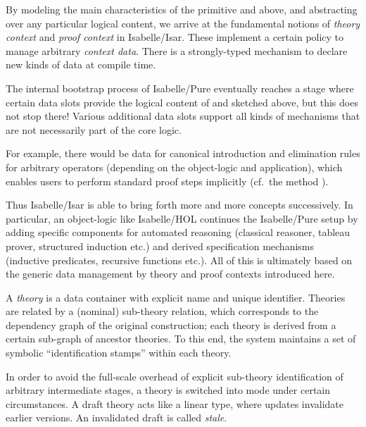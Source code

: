 \begin{isabellebody}
\begin{isamarkuptext}
\begin{itemize}
  \end{itemize}

  \medskip By modeling the main characteristics of the primitive
  \isa{{\isasymTheta}} and \isa{{\isasymGamma}} above, and abstracting over any
  particular logical content, we arrive at the fundamental notions of
  \emph{theory context} and \emph{proof context} in Isabelle/Isar.
  These implement a certain policy to manage arbitrary \emph{context
  data}.  There is a strongly-typed mechanism to declare new kinds of
  data at compile time.

  The internal bootstrap process of Isabelle/Pure eventually reaches a
  stage where certain data slots provide the logical content of \isa{{\isasymTheta}} and \isa{{\isasymGamma}} sketched above, but this does not stop there!
  Various additional data slots support all kinds of mechanisms that
  are not necessarily part of the core logic.

  For example, there would be data for canonical introduction and
  elimination rules for arbitrary operators (depending on the
  object-logic and application), which enables users to perform
  standard proof steps implicitly (cf.\ the  method
  \cite{isabelle-isar-ref}).

  \medskip Thus Isabelle/Isar is able to bring forth more and more
  concepts successively.  In particular, an object-logic like
  Isabelle/HOL continues the Isabelle/Pure setup by adding specific
  components for automated reasoning (classical reasoner, tableau
  prover, structured induction etc.) and derived specification
  mechanisms (inductive predicates, recursive functions etc.).  All of
  this is ultimately based on the generic data management by theory
  and proof contexts introduced here.%
\end{isamarkuptext}%
\isamarkuptrue%
%
\isamarkuptrue%
%
\begin{isamarkuptext}%
A \emph{theory} is a data container with explicit name and
  unique identifier.  Theories are related by a (nominal) sub-theory
  relation, which corresponds to the dependency graph of the original
  construction; each theory is derived from a certain sub-graph of
  ancestor theories.  To this end, the system maintains a set of
  symbolic ``identification stamps'' within each theory.

  In order to avoid the full-scale overhead of explicit sub-theory
  identification of arbitrary intermediate stages, a theory is
  switched into  mode under certain circumstances.  A
  draft theory acts like a linear type, where updates invalidate
  earlier versions.  An invalidated draft is called \emph{stale}.


\end{isamarkuptext}
\end{isabellebody}
